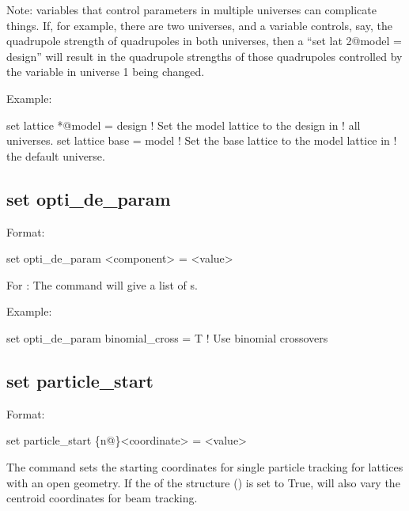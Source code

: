 {{Note: \tao variables that control parameters in multiple universes can complicate things. If, for
example, there are two universes, and a \tao variable controls, say, the quadrupole strength of
quadrupoles in both universes, then a ``set lat 2@model = design'' will result in the quadrupole
strengths of those quadrupoles controlled by the variable in universe 1 being changed.

Example:
\begin{example}
  set lattice *@model = design  ! Set the model lattice to the design in 
                                !   all universes.
  set lattice base = model      ! Set the base lattice to the model lattice in 
                                !   the default universe.
\end{example}


\subsection{set opti_de_param}
\label{s:set.opti.de.param}

Format:
\begin{example}
  set opti_de_param <component> = <value>
\end{example}

For : The  command will give a list of 
s.

Example:
\begin{example}
  set opti_de_param binomial_cross = T  ! Use binomial crossovers 
\end{example}


\subsection{set particle_start}
\label{s:set.particle.start}

Format:
\begin{example}
  set particle_start \{n@\}<coordinate> = <value>
\end{example}
The  command sets the starting coordinates for single particle tracking for
lattices with an open geometry. If the  of the 
structure () is set to True,  will also vary the centroid
coordinates for beam tracking.

}}
